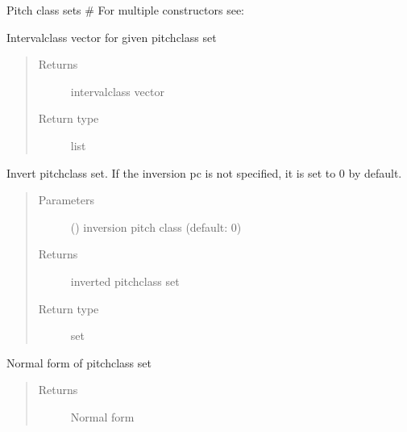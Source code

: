 \documentclass[letterpaper,10pt,english]{sphinxmanual}
\begin{document}
\begin{fulllineitems}
Pitch class sets
\# For multiple constructors see: 


\begin{fulllineitems}
Interval\sphinxhyphen{}class vector for given pitch\sphinxhyphen{}class set
\begin{quote}\begin{description}
\item[{Returns}] \leavevmode
interval\sphinxhyphen{}class vector

\item[{Return type}] \leavevmode
list

\end{description}\end{quote}

\end{fulllineitems}



\begin{fulllineitems}
Invert pitch\sphinxhyphen{}class set. If the inversion pc is not specified, it is set to 0 by default.
\begin{quote}\begin{description}
\item[{Parameters}] \leavevmode
{} () \textendash{} inversion pitch class (default: 0)

\item[{Returns}] \leavevmode
inverted pitch\sphinxhyphen{}class set

\item[{Return type}] \leavevmode
set

\end{description}\end{quote}

\end{fulllineitems}



\begin{fulllineitems}
Normal form of pitch\sphinxhyphen{}class set
\begin{quote}\begin{description}
\item[{Returns}] \leavevmode
Normal form


\end{description}
\end{quote}
\end{fulllineitems}
\end{fulllineitems}
\end{document}
